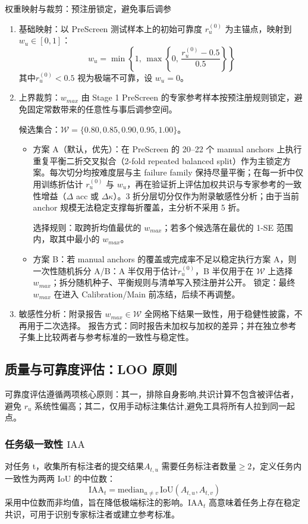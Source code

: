 权重映射与裁剪：预注册锁定，避免事后调参
\begin{enumerate}
    \item 基础映射：以 PreScreen 测试样本上的初始可靠度 $r_u^{\left(0\right)}$ 为主锚点，映射到 $w_u\in\left[0,1\right]$：
\[w_u=\min\left\{1,\,\max\left\{0,\,\frac{r_u^{(0)}-0.5}{0.5}\right\}\right\}\]
其中$r_u^{\left(0\right)}<0.5$ 视为极端不可靠，设 $w_u=0$。
    \item 上界裁剪：$w_{max}$ 由 Stage 1 PreScreen 的专家参考样本按预注册规则锁定，避免固定常数带来的任意性与事后调参空间。

候选集合：$\mathcal{W}=\{0.80,0.85,0.90,0.95,1.00\}$。
\begin{itemize}
    \item 方案 A（默认，优先）：在 PreScreen 的 20--22 个 manual anchors 上执行重复平衡二折交叉拟合（2-fold repeated balanced split）作为主锁定方案。每次切分均按难度层与主 failure family 保持尽量平衡；在每一折中仅用训练折估计 $r_u^{\left(0\right)}$ 与 $w_u$，再在验证折上评估加权共识与专家参考的一致性增益（$\Delta$ acc 或 $\Delta\kappa$）。3 折分层切分仅作为附录敏感性分析；由于当前 anchor 规模无法稳定支撑每折覆盖，主分析不采用 5 折。

选择规则：取跨折均值最优的 $w_{max}$；若多个候选落在最优的 1-SE 范围内，取其中最小的 $w_{max}$。
    \item 方案 B：若 manual anchors 的覆盖或完成率不足以稳定执行方案 A，则一次性随机拆分 A/B：A 半仅用于估计$r_u^{\left(0\right)}$，B 半仅用于在 $\mathcal{W}$ 上选择 $w_{max}$；拆分随机种子、平衡规则与清单写入预注册并公开。
锁定：最终 $w_{max}$ 在进入 Calibration/Main 前冻结，后续不再调整。
\end{itemize}


    \item 敏感性分析：附录报告 $w_{max}\in\mathcal{W}$ 全网格下结果一致性，用于稳健性披露，不再用于二次选择。
报告方式：同时报告未加权与加权的差异；并在独立参考子集上比较两者与参考标准的一致性与稳定性。
\end{enumerate}

\subsection{质量与可靠度评估：LOO 原则}

可靠度评估遵循两项核心原则：其一，排除自身影响,共识计算不包含被评估者，避免 $r_u$ 系统性偏高；其二，仅用手动标注集估计,避免工具将所有人拉到同一起点。
\subsubsection{任务级一致性 $\mathrm{IAA}$}
对任务 t，收集所有标注者的提交结果$A_{t,u}$ 需要任务标注者数量$\geq2$，定义任务内一致性为两两 IoU 的中位数：
\[\mathrm{IAA}_t=\mathrm{median}_{u\neq v}\,\mathrm{IoU}\left(A_{t,u},A_{t,v}\right)\]
采用中位数而非均值，旨在降低极端标注的影响。$\mathrm{IAA}_t$ 高意味着任务上存在稳定共识，可用于识别专家标注者或建立参考标准。
